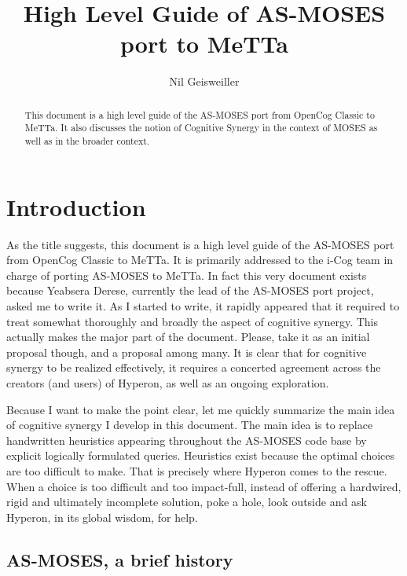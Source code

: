 \documentclass[]{report}
\begin{document}
\title{High Level Guide of AS-MOSES port to MeTTa}
\author{Nil Geisweiller}
\maketitle

\begin{abstract}
This document is a high level guide of the AS-MOSES port from OpenCog
Classic to MeTTa.  It also discusses the notion of Cognitive Synergy
in the context of MOSES as well as in the broader context.
\end{abstract}

\tableofcontents

\chapter{Introduction}

As the title suggests, this document is a high level guide of the
AS-MOSES port from OpenCog Classic to MeTTa.  It is primarily
addressed to the i-Cog team in charge of porting AS-MOSES to MeTTa.
In fact this very document exists because Yeabsera Derese, currently
the lead of the AS-MOSES port project, asked me to write it.  As I
started to write, it rapidly appeared that it required to treat
somewhat thoroughly and broadly the aspect of cognitive synergy.  This
actually makes the major part of the document.  Please, take it as an
initial proposal though, and a proposal among many.  It is clear that
for cognitive synergy to be realized effectively, it requires a
concerted agreement across the creators (and users) of Hyperon, as
well as an ongoing exploration.

Because I want to make the point clear, let me quickly summarize the
main idea of cognitive synergy I develop in this document.  The main
idea is to replace handwritten heuristics appearing throughout the
AS-MOSES code base by explicit logically formulated queries.
Heuristics exist because the optimal choices are too difficult to
make.  That is precisely where Hyperon comes to the rescue.  When a
choice is too difficult and too impact-full, instead of offering a
hardwired, rigid and ultimately incomplete solution, poke a hole, look
outside and ask Hyperon, in its global wisdom, for help.

\section{AS-MOSES, a brief history}
\end{document}
